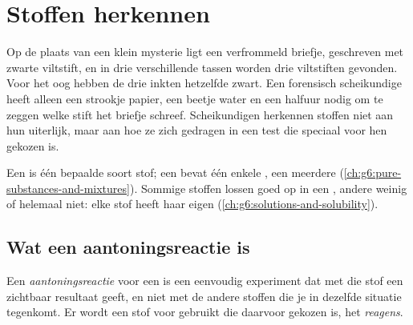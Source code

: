 \chapter{Stoffen herkennen}\label{ch:g7:identifying-substances}

Op de plaats van een klein mysterie ligt een verfrommeld briefje,
geschreven met zwarte viltstift, en in drie verschillende tassen worden
drie viltstiften gevonden. Voor het oog hebben de drie inkten hetzelfde
zwart. Een forensisch scheikundige heeft alleen een strookje papier, een
beetje water en een halfuur nodig om te zeggen welke stift het briefje
schreef. Scheikundigen herkennen stoffen niet aan hun uiterlijk, maar aan
hoe ze zich gedragen in een test die speciaal voor hen gekozen is.

\begin{recall}
Een  is één bepaalde soort stof; een  bevat één
enkele , een  meerdere
(\cref{ch:g6:pure-substances-and-mixtures}). Sommige stoffen lossen goed op
in een , andere weinig of helemaal niet: elke stof heeft haar
eigen  (\cref{ch:g6:solutions-and-solubility}).
\end{recall}

\section{Wat een aantoningsreactie is}

\begin{definition}\label{def:g7:identifying-substances:characteristic-test}
Een \emph{aantoningsreactie} voor een  is een eenvoudig experiment dat met die stof een zichtbaar resultaat
geeft, en niet met de andere stoffen die je in dezelfde situatie
tegenkomt. Er wordt een stof voor gebruikt die daarvoor gekozen is, het
\emph{reagens}.
\end{definition}


